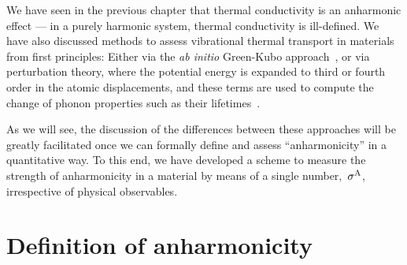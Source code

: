 \label{chp:anharmonicity}

We have seen in the previous chapter that thermal conductivity is an anharmonic effect --- in a purely harmonic system, thermal conductivity is ill-defined. We have also discussed methods to assess vibrational thermal transport in materials from first principles: Either via the \emph{ab initio} Green-Kubo approach~\cite{Marcolongo.2016,Carbogno.2016}, or via perturbation theory, where the potential energy is expanded to third or fourth order in the atomic displacements, and these terms are used to compute the change of phonon properties such as their lifetimes~\cite{Broido.2007,Simoncelli.2019,Isaeva.2019,Feng.2016,Feng.2017,Ravichandran.2018,Xia.2018}.

As we will see, the discussion of the differences between these approaches will be greatly facilitated once we can formally define and assess ``anharmonicity'' in a quantitative way. To this end, we have developed a scheme to measure the strength of anharmonicity in a material by means of a single number,~$\sigma^\mathrm{A}$, irrespective of physical observables.



\section{Definition of anharmonicity}
\label{sec:anharmonicity.definition}

